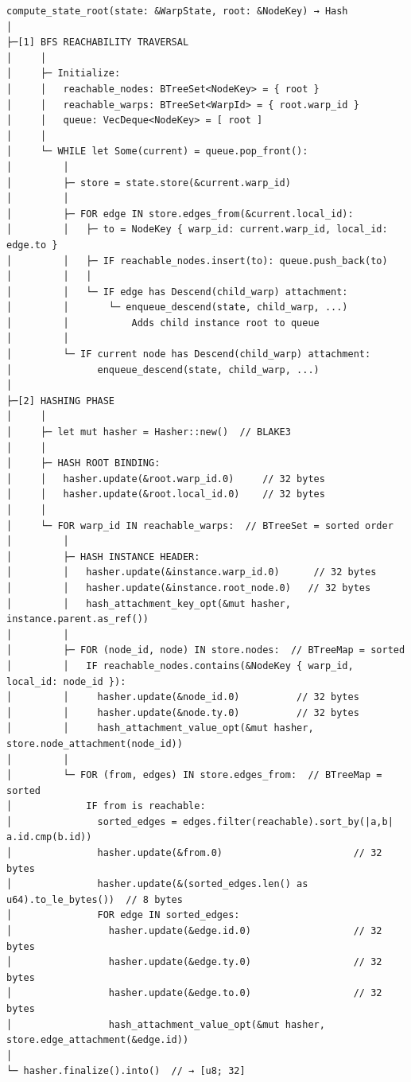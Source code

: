 \documentclass[11pt]{book}
\begin{document}
\begin{verbatim}
compute_state_root(state: &WarpState, root: &NodeKey) → Hash
│
├─[1] BFS REACHABILITY TRAVERSAL
│     │
│     ├─ Initialize:
│     │   reachable_nodes: BTreeSet<NodeKey> = { root }
│     │   reachable_warps: BTreeSet<WarpId> = { root.warp_id }
│     │   queue: VecDeque<NodeKey> = [ root ]
│     │
│     └─ WHILE let Some(current) = queue.pop_front():
│         │
│         ├─ store = state.store(&current.warp_id)
│         │
│         ├─ FOR edge IN store.edges_from(&current.local_id):
│         │   ├─ to = NodeKey { warp_id: current.warp_id, local_id: edge.to }
│         │   ├─ IF reachable_nodes.insert(to): queue.push_back(to)
│         │   │
│         │   └─ IF edge has Descend(child_warp) attachment:
│         │       └─ enqueue_descend(state, child_warp, ...)
│         │           Adds child instance root to queue
│         │
│         └─ IF current node has Descend(child_warp) attachment:
│               enqueue_descend(state, child_warp, ...)
│
├─[2] HASHING PHASE
│     │
│     ├─ let mut hasher = Hasher::new()  // BLAKE3
│     │
│     ├─ HASH ROOT BINDING:
│     │   hasher.update(&root.warp_id.0)     // 32 bytes
│     │   hasher.update(&root.local_id.0)    // 32 bytes
│     │
│     └─ FOR warp_id IN reachable_warps:  // BTreeSet = sorted order
│         │
│         ├─ HASH INSTANCE HEADER:
│         │   hasher.update(&instance.warp_id.0)      // 32 bytes
│         │   hasher.update(&instance.root_node.0)   // 32 bytes
│         │   hash_attachment_key_opt(&mut hasher, instance.parent.as_ref())
│         │
│         ├─ FOR (node_id, node) IN store.nodes:  // BTreeMap = sorted
│         │   IF reachable_nodes.contains(&NodeKey { warp_id, local_id: node_id }):
│         │     hasher.update(&node_id.0)          // 32 bytes
│         │     hasher.update(&node.ty.0)          // 32 bytes
│         │     hash_attachment_value_opt(&mut hasher, store.node_attachment(node_id))
│         │
│         └─ FOR (from, edges) IN store.edges_from:  // BTreeMap = sorted
│             IF from is reachable:
│               sorted_edges = edges.filter(reachable).sort_by(|a,b| a.id.cmp(b.id))
│               hasher.update(&from.0)                       // 32 bytes
│               hasher.update(&(sorted_edges.len() as u64).to_le_bytes())  // 8 bytes
│               FOR edge IN sorted_edges:
│                 hasher.update(&edge.id.0)                  // 32 bytes
│                 hasher.update(&edge.ty.0)                  // 32 bytes
│                 hasher.update(&edge.to.0)                  // 32 bytes
│                 hash_attachment_value_opt(&mut hasher, store.edge_attachment(&edge.id))
│
└─ hasher.finalize().into()  // → [u8; 32]
\end{verbatim}
\end{document}
